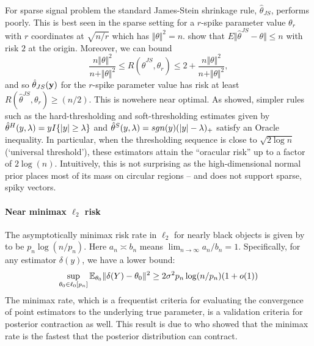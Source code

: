 \documentclass[11pt]{article}
\begin{document}
For sparse signal problem the standard James-Stein shrinkage rule, $ \hat{\theta}_{JS} $, performs poorly. This is best seen in the sparse setting for a $r$-spike parameter value $ \theta_r$ with $r$ coordinates at $ \sqrt{n/r} $ which has $ \Vert \theta \Vert^2 =n $. \citet{johnstone2004needles} show that $ E \Vert \hat{\theta}^{JS} - \theta \Vert \leq n $ with risk $2$ at the origin. Moreover, we can bound
\[
\frac{n \Vert \theta \Vert^2}{ n + \Vert \theta \Vert^2} \leq R \left ( \hat{\theta}^{JS} , \theta_r \right ) \leq
2 + \frac{n \Vert \theta \Vert^2}{ n + \Vert \theta \Vert^2},
\]
and so ${\hat{\theta}}_{JS}{}({\bf y})$ for the $r$-spike parameter value has risk at least $ R \left( \hat{\theta}^{JS} , \theta_r \right) \geq (n/2)$. This is nowehere near optimal. As \citet{donoho1994ideal} showed, simpler rules such as the hard-thresholding and soft-thresholding estimates given by $\hat{\theta}^{H}(y,\lambda) = y I\{\lvert y\rvert \ge \lambda \}$ and $\hat{\theta}^{S}(y,\lambda) = sgn(y) (\lvert y\rvert - \lambda)_{+}$ satisfy an Oracle inequality. In particular, when the thresholding sequence is close to $\sqrt{2\log n}$ (`universal threshold'), these estimators attain the ``oracular risk'' up to a factor of $2\log(n)$. Intuitively, this is not surprising as the high-dimensional normal prior places most of its mass on circular regions -- and does not support sparse, spiky vectors. 

\paragraph{Near minimax $\ell_2$ risk}

The asymptotically minimax risk rate in $\ell_2$ for nearly black objects is given by \citet{donoho1992maximum} to be $p_n \log \left ( n / p_n \right )$. Here $a_n \asymp b_n$ means $\lim_{n\to\infty} a_n/b_n=1$. Specifically, for any estimator $\delta(y)$, we have a lower bound: 
\begin{equation}
\sup_{\theta_0 \in \ell_0[p_n]} \mathbb E_{\theta_0} \lVert\delta(Y) - \theta_0\rVert^2 \ge 2 \sigma^2 p_n \log(n/p_n)(1+o(1))
\end{equation}
The minimax rate, which is a frequentist criteria for evaluating the convergence of point estimators to the underlying true parameter, is a validation criteria for posterior contraction as well. This result is due to \citet{ghosal2000} who showed that the minimax rate is the fastest that the posterior distribution can contract. 
\end{document}
